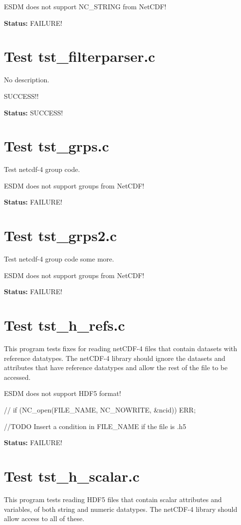 ESDM does not support NC\_STRING from NetCDF!

{\bf \large Status: } FAILURE!

\section{Test tst\_filterparser.c}

No description.

SUCCESS!!

{\bf \large Status: } SUCCESS!

\section{Test tst\_grps.c}

Test netcdf-4 group code.

ESDM does not support groups from NetCDF!

{\bf \large Status: } FAILURE!

\section{Test tst\_grps2.c}

Test netcdf-4 group code some more.

ESDM does not support groups from NetCDF!

{\bf \large Status: } FAILURE!

\section{Test tst\_h\_refs.c}

This program tests fixes for reading netCDF-4 files that contain datasets with reference datatypes.  The netCDF-4 library should ignore the datasets and attributes that have reference datatypes and allow the rest of the file to be accessed.

ESDM does not support HDF5 format!

// if (NC\_open(FILE\_NAME, NC\_NOWRITE, \&ncid)) ERR;

//TODO Insert a condition in FILE\_NAME if the file is .h5

{\bf \large Status: } FAILURE!

\section{Test tst\_h\_scalar.c}

This program tests reading HDF5 files that contain scalar attributes and variables, of both string and numeric datatypes.  The netCDF-4 library should allow access to all of these.

